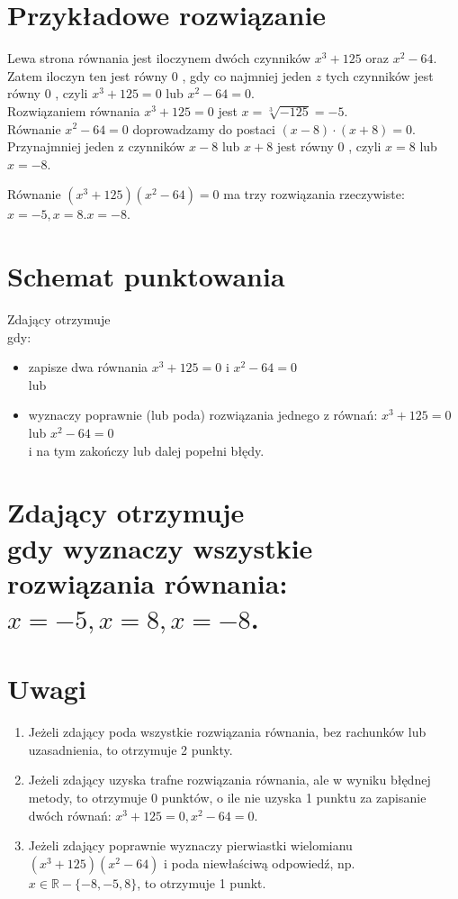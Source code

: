 \documentclass[10pt]{article}
\begin{document}
\section*{Przykładowe rozwiązanie}
Lewa strona równania jest iloczynem dwóch czynników $x^{3}+125$ oraz $x^{2}-64$. Zatem iloczyn ten jest równy 0 , gdy co najmniej jeden $z$ tych czynników jest równy 0 , czyli $x^{3}+125=0$ lub $x^{2}-64=0$.\\
Rozwiązaniem równania $x^{3}+125=0$ jest $x=\sqrt[3]{-125}=-5$.\\
Równanie $x^{2}-64=0$ doprowadzamy do postaci $(x-8) \cdot(x+8)=0$. Przynajmniej jeden z czynników $x-8$ lub $x+8$ jest równy 0 , czyli $x=8$ lub $x=-8$.

Równanie $\left(x^{3}+125\right)\left(x^{2}-64\right)=0$ ma trzy rozwiązania rzeczywiste: $x=-5, x=8 . x=-8$.

\section*{Schemat punktowania}
Zdający otrzymuje\\
gdy:

\begin{itemize}
  \item zapisze dwa równania $x^{3}+125=0$ i $x^{2}-64=0$\\
lub
  \item wyznaczy poprawnie (lub poda) rozwiązania jednego z równań: $x^{3}+125=0$ lub $x^{2}-64=0$\\
i na tym zakończy lub dalej popełni błędy.
\end{itemize}

\section*{Zdający otrzymuje \\
 gdy wyznaczy wszystkie rozwiązania równania: $x=-5, x=8, x=-8$.}
\section*{Uwagi}
\begin{enumerate}
  \item Jeżeli zdający poda wszystkie rozwiązania równania, bez rachunków lub uzasadnienia, to otrzymuje 2 punkty.
  \item Jeżeli zdający uzyska trafne rozwiązania równania, ale w wyniku błędnej metody, to otrzymuje 0 punktów, o ile nie uzyska 1 punktu za zapisanie dwóch równań: $x^{3}+125=0, x^{2}-64=0$.
  \item Jeżeli zdający poprawnie wyznaczy pierwiastki wielomianu $\left(x^{3}+125\right)\left(x^{2}-64\right)$ i poda niewłaściwą odpowiedź, np. $x \in \mathbb{R}-\{-8,-5,8\}$, to otrzymuje 1 punkt.
\end{enumerate}
\end{document}
